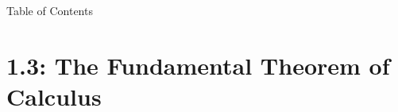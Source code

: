 

 \begin{frame}{Table of Contents }
\mapofcontentsA{\ac,\aintro}
\label{note1.3a}
 \end{frame}
\section{1.3: The Fundamental Theorem of Calculus}
